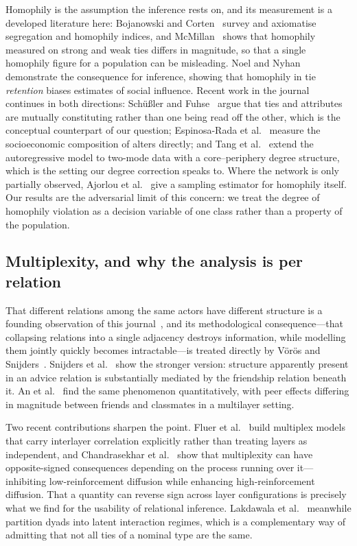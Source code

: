 \documentclass[onecolumn,pdflatex,sn-basic,Numbered]{sn-jnl}
\theoremstyle{thmstyleone}
\theoremstyle{thmstylethree}
\begin{document}
Homophily is the assumption the inference rests on, and its measurement is a
developed literature here: Bojanowski and Corten~\citep{bojanowski2014measuring}
survey and axiomatise segregation and homophily indices, and
McMillan~\citep{mcmillan2022worth} shows that homophily measured on strong and weak
ties differs in magnitude, so that a single homophily figure for a population can be
misleading. Noel and Nyhan~\citep{noel2011unfriending} demonstrate the consequence for
inference, showing that homophily in tie \emph{retention} biases estimates of social
influence. Recent work in the journal continues in both directions: Sch\"u{\ss}ler and
Fuhse~\citep{schussler2025duality} argue that ties and attributes are mutually
constituting rather than one being read off the other, which is the conceptual
counterpart of our question; Espinosa-Rada et al.~\citep{espinosarada2026socioeconomic}
measure the socioeconomic composition of alters directly; and Tang et
al.~\citep{tang2026twomode} extend the autoregressive model to two-mode data with a
core--periphery degree structure, which is the setting our degree correction speaks to.
Where the network is only partially observed, Ajorlou et
al.~\citep{ajorlou2025dirichlet} give a sampling estimator for homophily itself.
Our results are the adversarial limit of this concern: we treat the degree
of homophily violation as a decision variable of one class rather than a property of
the population.

\subsection{Multiplexity, and why the analysis is per relation}
\label{sec:related-multiplex}

That different relations among the same actors have different structure is a founding
observation of this journal~\citep{lazega1999multiplexity}, and its methodological
consequence---that collapsing relations into a single adjacency destroys information,
while modelling them jointly quickly becomes intractable---is treated directly by
V\"or\"os and Snijders~\citep{voros2017cluster}. Snijders et
al.~\citep{snijders2013model} show the stronger version: structure apparently present
in an advice relation is substantially mediated by the friendship relation beneath
it. An et al.~\citep{an2026estimating} find the same phenomenon quantitatively, with
peer effects differing in magnitude between friends and classmates in a multilayer
setting.

Two recent contributions sharpen the point. Fluer et
al.~\citep{fluer2026survey} build multiplex models that carry interlayer
correlation explicitly rather than treating layers as independent, and Chandrasekhar et
al.~\citep{chandrasekhar2026multiplexing} show that multiplexity can have
opposite-signed consequences depending on the process running over it---inhibiting
low-reinforcement diffusion while enhancing high-reinforcement diffusion. That a
quantity can reverse sign across layer configurations is precisely what we find for the
usability of relational inference. Lakdawala et
al.~\citep{lakdawala2026bonds} meanwhile partition dyads into latent interaction
regimes, which is a complementary way of admitting that not all ties of a nominal type
are the same.
\end{document}
